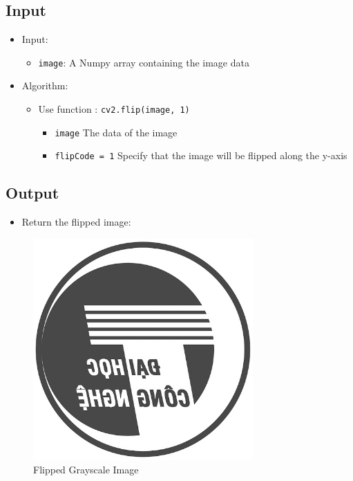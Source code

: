 \documentclass{article}
\begin{document}
\subsection{Input}
\begin{itemize}
    \item Input:
    \begin{itemize}
        \item \lstinline{image}: A Numpy array containing the image data
    \end{itemize}
    
    \item Algorithm:
    \begin{itemize}
        \item Use function : \lstinline{cv2.flip(image, 1)} 
        \begin{itemize}
            \item \lstinline{image} The data of the image
            \item \lstinline{flipCode = 1} Specify that the image will be flipped along the y-axis
        \end{itemize}
    
    \end{itemize}
\end{itemize}

\subsection{Output}
\begin{itemize}
    \item Return the flipped image:
\end{itemize}

\begin{figure}[H]
    \centering
    \includegraphics[width=0.75\textwidth]{lena_gray_flipped.jpg}
    \caption{Flipped Grayscale Image}
    \label{fig:flipped_grayscale_img}
\end{figure}
\end{document}
